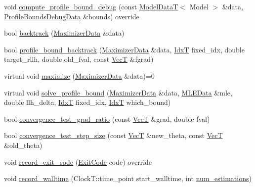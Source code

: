 \begin{DoxyCompactItemize}
\item 
void \hyperlink{classmappel_1_1estimator_1_1IterativeMaximizer_a94b9ba4469f0a32d9f8b7628a252b9e5}{compute\+\_\+profile\+\_\+bound\+\_\+debug} (const \hyperlink{namespacemappel_a97f050df953605381ae9c901c3b125f1}{Model\+DataT}$<$ Model $>$ \&data, \hyperlink{namespacemappel_1_1estimator_structmappel_1_1estimator_1_1ProfileBoundsDebugData}{Profile\+Bounds\+Debug\+Data} \&bounds) override
\item 
bool \hyperlink{classmappel_1_1estimator_1_1IterativeMaximizer_a6c3c55a166beb23fb61f14e040f2a0db}{backtrack} (\hyperlink{classmappel_1_1estimator_1_1IterativeMaximizer_1_1MaximizerData}{Maximizer\+Data} \&data)
\item 
bool \hyperlink{classmappel_1_1estimator_1_1IterativeMaximizer_ae9ea3c4a5fbfb9edac5c1c0f7bc070ae}{profile\+\_\+bound\+\_\+backtrack} (\hyperlink{classmappel_1_1estimator_1_1IterativeMaximizer_1_1MaximizerData}{Maximizer\+Data} \&data, \hyperlink{namespacemappel_ab17ec0f30b61ece292439d7ece81d3a8}{IdxT} fixed\+\_\+idx, double target\+\_\+rllh, double old\+\_\+fval, const \hyperlink{namespacemappel_a2225ad69f358daa3f4f99282a35b9a3a}{VecT} \&fgrad)
\item 
virtual void \hyperlink{classmappel_1_1estimator_1_1IterativeMaximizer_a06efc51f03c16afc52884e5703867b4d}{maximize} (\hyperlink{classmappel_1_1estimator_1_1IterativeMaximizer_1_1MaximizerData}{Maximizer\+Data} \&data)=0
\item 
virtual void \hyperlink{classmappel_1_1estimator_1_1IterativeMaximizer_a8060bc5f7c9e78bf6767bcfbaded4927}{solve\+\_\+profile\+\_\+bound} (\hyperlink{classmappel_1_1estimator_1_1IterativeMaximizer_1_1MaximizerData}{Maximizer\+Data} \&data, \hyperlink{namespacemappel_1_1estimator_structmappel_1_1estimator_1_1MLEData}{M\+L\+E\+Data} \&mle, double llh\+\_\+delta, \hyperlink{namespacemappel_ab17ec0f30b61ece292439d7ece81d3a8}{IdxT} fixed\+\_\+idx, \hyperlink{namespacemappel_ab17ec0f30b61ece292439d7ece81d3a8}{IdxT} which\+\_\+bound)
\item 
bool \hyperlink{classmappel_1_1estimator_1_1IterativeMaximizer_a6345ac1513a0dfd192e1aae9bf563e32}{convergence\+\_\+test\+\_\+grad\+\_\+ratio} (const \hyperlink{namespacemappel_a2225ad69f358daa3f4f99282a35b9a3a}{VecT} \&grad, double fval)
\item 
bool \hyperlink{classmappel_1_1estimator_1_1IterativeMaximizer_a271ebb64a7d248bc7f75dd323c7d3310}{convergence\+\_\+test\+\_\+step\+\_\+size} (const \hyperlink{namespacemappel_a2225ad69f358daa3f4f99282a35b9a3a}{VecT} \&new\+\_\+theta, const \hyperlink{namespacemappel_a2225ad69f358daa3f4f99282a35b9a3a}{VecT} \&old\+\_\+theta)
\item 
void \hyperlink{classmappel_1_1estimator_1_1ThreadedEstimator_ae5fe99504a34bfd854915a2156ed462c}{record\+\_\+exit\+\_\+code} (\hyperlink{namespacemappel_1_1estimator_ae49999202b8a1968bc308aa30ac24e6c}{Exit\+Code} code) override
\item 
void \hyperlink{classmappel_1_1estimator_1_1Estimator_a864a87d5dc2937e1d67e6bcffb0b5234}{record\+\_\+walltime} (Clock\+T\+::time\+\_\+point start\+\_\+walltime, int \hyperlink{classmappel_1_1estimator_1_1Estimator_a9f5390f0ac3ee127ddcd90dc6f4fd889}{num\+\_\+estimations})
\end{DoxyCompactItemize}
